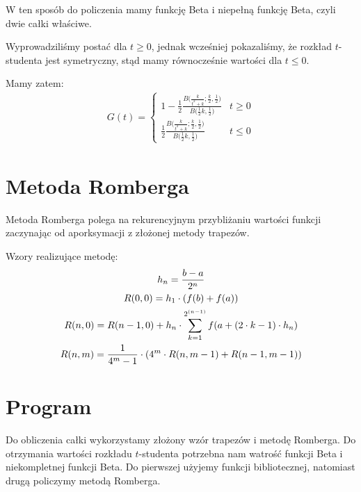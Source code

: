\documentclass{article}
\begin{document}
W ten sposób do policzenia mamy funkcję Beta i niepełną funkcję Beta, czyli dwie całki właściwe.

\pagebreak

Wyprowadziliśmy postać dla $t \geq 0$, jednak wcześniej pokazaliśmy, że rozkład $t$-studenta jest symetryczny, stąd mamy równocześnie wartości dla $t \leq 0$. 

Mamy zatem:
\begin{gather*}
G(t) = 
\begin{cases}
    1 - \frac{1}{2} \frac{B\Big(\frac{k}{t^2 + k}; \frac{k}{2}, \frac{1}{2}\Big)}{B{\Big(\frac{1}{2}k, \frac{1}{2}\Big) }}  & t \geq 0\\
    \frac{1}{2} \frac{B\Big(\frac{k}{t^2 + k}; \frac{k}{2}, \frac{1}{2}\Big)}{B{\Big(\frac{1}{2}k, \frac{1}{2}\Big) }}  & t \leq 0
\end{cases}
\end{gather*}

\section*{Metoda Romberga}

Metoda Romberga polega na rekurencyjnym przybliżaniu wartości funkcji zaczynając od aporksymacji z złożonej metody trapezów.

Wzory realizujące metodę:
\begin{gather*}
h_n = {b-a \over 2^n}\\
R(0,0) = h_1 \cdot (f(b)+f(a))\\
R(n,0) = R(n-1,0) +  h_n \cdot \sum_{k=1}^{2^{(n-1)}} f(a+(2\cdot k-1) \cdot h_n)\\
R(n,m) = {1 \over 4^m -1} \cdot (4^m \cdot R(n,m-1) + R(n-1,m-1))\\
\end{gather*}

\pagebreak

\section*{Program}

Do obliczenia całki wykorzystamy złożony wzór trapezów i metodę Romberga.
Do otrzymania wartości rozkładu $t$-studenta potrzebna nam watrość funkcji Beta i niekompletnej funkcji Beta. Do pierwszej użyjemy funkcji bibliotecznej, natomiast drugą policzymy metodą Romberga.
\end{document}
